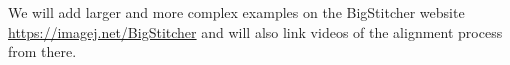 \documentclass[]{spie}  %
\begin{document}
\begin{description}
\end{description}

We will add larger and more complex examples on the BigStitcher website \url{https://imagej.net/BigStitcher} and will also link videos of the  alignment process from there.





\end{document}
